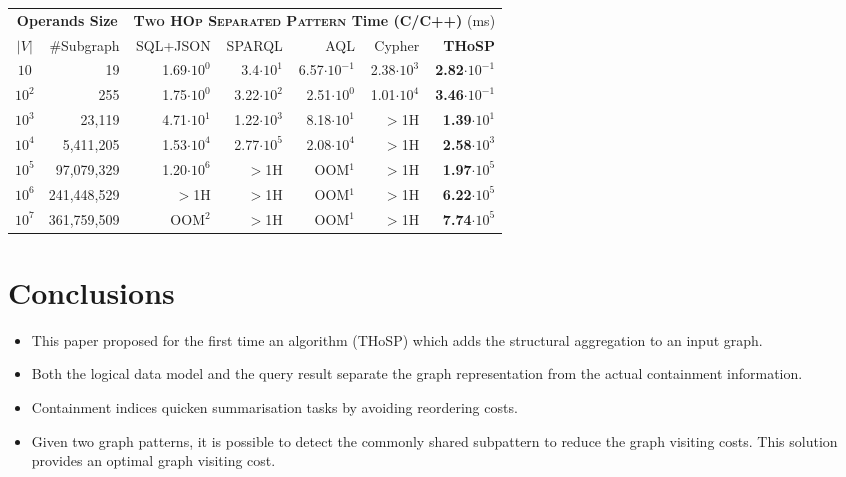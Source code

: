 \documentclass[a0,portrait]{a0poster}
\begin{document}
\begin{multicols}{2}
\begin{center}
\begin{tabular}{@{}cr|rrrr|r@{}}
	\toprule
	\multicolumn{2}{c}{\textbf{Operands Size}} & \multicolumn{5}{|c}{\textbf{\textsc{Two HOp Separated Pattern} Time (C/C++)} (ms)}  \\
	$|V|$  & \#Subgraph  &  {SQL+JSON} & SPARQL & AQL  &  Cypher &{\textbf{THoSP}}  \\
	\midrule
	$10$ & 19  & 1.69$\cdot 10^0$   &  3.4$\cdot 10^1$  & 6.57$\cdot 10^{-1}$  & 2.38$\cdot 10^3$    & \textbf{2.82}$\cdot 10^{-1}$\\
	$10^2$ & 255 & 1.75$\cdot 10^0$  & 3.22$\cdot 10^2$ & 2.51$\cdot 10^0$  & 1.01$\cdot 10^4$    & \textbf{3.46}$\cdot 10^{-1}$\\
	$10^3$ & 23,119  & 4.71$\cdot 10^1$ &  1.22$\cdot 10^3$ & 8.18$\cdot 10^1$  & $>$1H & \textbf{1.39}$\cdot 10^{1}$\\
	$10^4$ & 5,411,205  & 1.53$\cdot 10^4$ &  2.77$\cdot 10^5$ & 2.08$\cdot 10^4$  & $>$1H & \textbf{2.58}$\cdot 10^3$\\
	$10^5$ & 97,079,329  & 1.20$\cdot 10^6$ & $>$1H & {\color{red}OOM$^1$}  & $>$1H & \textbf{1.97}$\cdot 10^5$ \\
	$10^6$ & 241,448,529  & $>$1H &           $>$1H & {\color{red}OOM$^1$}  & $>$1H    & \textbf{6.22}$\cdot 10^5$\\
	$10^7$ & 361,759,509  & {\color{red}OOM$^2$} &      $>$1H & {\color{red}OOM$^1$}  & $>$1H      & \textbf{7.74}$\cdot 10^5$\\
	\bottomrule
\end{tabular}
\end{center}

\color{SaddleBrown} %

\section*{Conclusions}

\begin{itemize}
\item This paper proposed for the first time an algorithm (THoSP) which adds the structural aggregation to an input graph.
\item Both the logical data model and the query result separate the graph representation from
the actual containment information.
\item Containment indices quicken summarisation tasks by avoiding reordering costs.
\item Given two graph patterns, it is possible to detect the commonly shared subpattern to reduce the graph visiting costs. This solution provides an optimal graph visiting cost.
\end{itemize}



\end{multicols}
\end{document}
